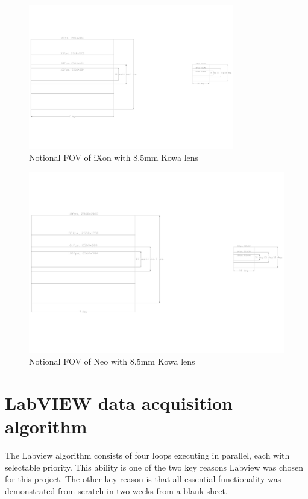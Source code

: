 \begin{figure}    \centering
    \includegraphics[trim=2650 1050 20 950,clip,width=0.8\textwidth]{gfx/sensorsSize}
    \caption{Notional FOV of iXon with 8.5mm Kowa lens}\label{fig:ixonFOV}
\end{figure}
\begin{figure}  \centering
    \includegraphics[trim=30 450 1600 450,clip,width=\textwidth]{gfx/sensorsSize}
    \caption{Notional FOV of Neo with 8.5mm Kowa lens}\label{fig:neoFOV}
\end{figure}

\section{LabVIEW data acquisition algorithm}
The Labview algorithm consists of four loops executing in parallel, each with selectable priority. 
This ability is one of the two key reasons Labview was chosen for this project.
The other key reason is that all essential functionality was demonstrated from scratch in two weeks from a blank sheet. 

